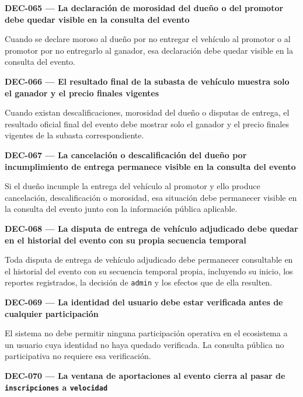 \documentclass[10pt,letterpaper]{article}
\begin{document}
\noindent\textbf{DEC-065 --- La declaración de morosidad del dueño o del promotor debe quedar visible en la consulta del evento}\par
Cuando se declare moroso al dueño por no entregar el vehículo al promotor o al promotor por no entregarlo al ganador, esa declaración debe quedar visible en la consulta del evento.\par\vspace{0.45em}
\noindent\textbf{DEC-066 --- El resultado final de la subasta de vehículo muestra solo el ganador y el precio finales vigentes}\par
Cuando existan descalificaciones, morosidad del dueño o disputas de entrega, el resultado oficial final del evento debe mostrar solo el ganador y el precio finales vigentes de la subasta correspondiente.\par\vspace{0.45em}
\noindent\textbf{DEC-067 --- La cancelación o descalificación del dueño por incumplimiento de entrega permanece visible en la consulta del evento}\par
Si el dueño incumple la entrega del vehículo al promotor y ello produce cancelación, descalificación o morosidad, esa situación debe permanecer visible en la consulta del evento junto con la información pública aplicable.\par\vspace{0.45em}
\noindent\textbf{DEC-068 --- La disputa de entrega de vehículo adjudicado debe quedar en el historial del evento con su propia secuencia temporal}\par
Toda disputa de entrega de vehículo adjudicado debe permanecer consultable en el historial del evento con su secuencia temporal propia, incluyendo su inicio, los reportes registrados, la decisión de \texttt{admin} y los efectos que de ella resulten.\par\vspace{0.45em}
\noindent\textbf{DEC-069 --- La identidad del usuario debe estar verificada antes de cualquier participación}\par
El sistema no debe permitir ninguna participación operativa en el ecosistema a un usuario cuya identidad no haya quedado verificada. La consulta pública no participativa no requiere esa verificación.\par\vspace{0.45em}
\noindent\textbf{DEC-070 --- La ventana de aportaciones al evento cierra al pasar de \texttt{inscripciones} a \texttt{velocidad}}\par
\end{document}
